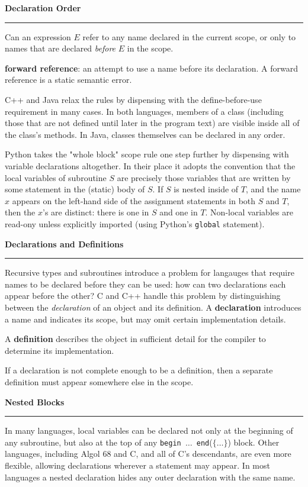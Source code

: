 \nopagenumbers
{\bf Declaration Order}
\vskip 1mm
\hrule

\vskip 6pt
Can an expression $E$ refer to any name declared in the current scope, or only to names that are declared {\it before} $E$ in the scope.

\vskip 6pt
{\bf forward reference}: an attempt to use a name before its declaration. A forward reference is a static semantic error.

\vskip 6pt
C++ and Java relax the rules by dispensing with the define-before-use  requirement in many cases. In both languages, members of a class (including those that are not defined until later in the program text) are visible inside all of the class's methods. In Java, classes themselves can be declared in any order.

\vskip 6pt
Python takes the "whole block" scope rule one step further by dispensing with variable declarations altogether. In their place it adopts the convention that the local variables of subroutine $S$ are precisely those variables that are written by some statement in the (static) body of $S$. If $S$ is nested inside of $T$, and the name $x$ appears on the left-hand side of the assignment statements in both $S$ and $T$, then the $x$'s are distinct: there is one in $S$ and one in $T$. Non-local variables are read-ony unless explicitly imported (using Python's {\tt global} statement).

\vskip 12pt
{\bf Declarations and Definitions}
\vskip 1mm
\hrule

\vskip 6pt
Recursive types and subroutines introduce a problem for langauges that require names to be declared before they can be used: how can two declarations each appear before the other? C and C++ handle this problem by distinguishing between the {\it declaration} of an object and its {definition}.
\vskip 6pt
A {\bf declaration} introduces a name and indicates its scope, but may omit certain implementation details.

\vskip 6pt
A {\bf definition} describes the object in sufficient detail for the compiler to determine its implementation.

\vskip 6pt
If a declaration is not complete enough to be a definition, then a separate definition must appear somewhere else in the scope.

\vskip 12pt
{\bf Nested Blocks}
\vskip 1mm
\hrule

\vskip 6pt
In many languages, local variables can be declared not only at the beginning of any subroutine, but also at the top of any {\tt begin $\ldots$ end}($\lbrace\ldots\rbrace$) block. Other languages, including Algol 68 and C, and all of C's descendants, are even more flexible, allowing declarations wherever a statement may appear. In most languages a nested declaration hides any outer declaration with the same name.
\vfill\eject
\bye
